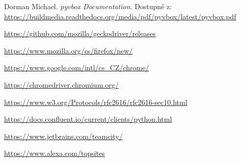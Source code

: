 \documentclass[thesis=M,czech,hidelinks]{FITthesis}[2013/05/06]
\begin{document}
\begin{thebibliography}{9}
	Dorman Michael. \textit{pyvbox Documentation}.  Dostupné z: \\
	\url{https://buildmedia.readthedocs.org/media/pdf/pyvbox/latest/pyvbox.pdf}
	
	\url{https://github.com/mozilla/geckodriver/releases}
	
	\url{https://www.mozilla.org/cs/firefox/new/}
	
	\url{https://www.google.com/intl/cs_CZ/chrome/}
	
	\url{https://chromedriver.chromium.org/}
	
	\url{https://www.w3.org/Protocols/rfc2616/rfc2616-sec10.html}
	
	\url{https://docs.confluent.io/current/clients/python.html}
	
	\url{https://www.jetbrains.com/teamcity/}
	
	\url{https://www.alexa.com/topsites}
	
\end{thebibliography}

\appendix



\end{document}
